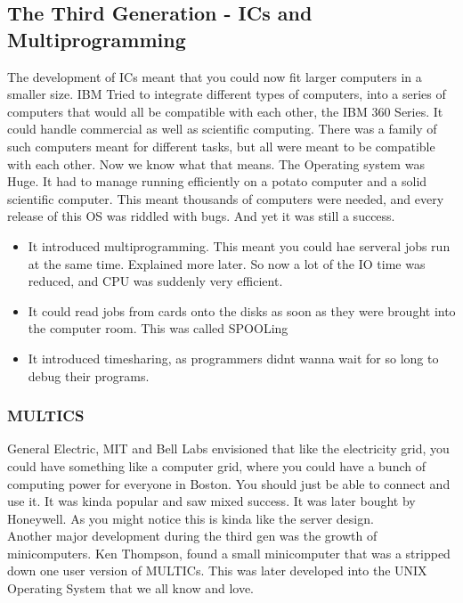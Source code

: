 \documentclass[11pt]{article}
\begin{document}
\subsection{The Third Generation - ICs and Multiprogramming}

The development of ICs meant that you could now fit larger computers in a smaller size. IBM Tried to integrate different types of computers, into a series of computers that would all be compatible with each other, the IBM 360 Series. It could handle commercial as well as scientific computing. There was a family of such computers meant for different tasks, but all were meant to be compatible with each other. Now we know what that means. The Operating system was Huge. It had to manage running efficiently on a potato computer and a solid scientific computer. This meant thousands of computers were needed, and every release of this OS was riddled with bugs. And yet it was still a success. 

\begin{itemize}
	\item It introduced multiprogramming. This meant you could hae serveral jobs run at the same time. Explained more later. So now a lot of the IO time was reduced, and CPU was suddenly very efficient. 
	\item It could read jobs from cards onto the disks as soon as they were brought into the computer room. This was called SPOOLing
	\item It introduced timesharing, as programmers didnt wanna wait for so long to debug their programs. 
\end{itemize}

\subsubsection{MULTICS}
General Electric, MIT and Bell Labs envisioned that like the electricity grid, you could have something like a computer grid, where you could have a bunch of computing power for everyone in Boston. You should just be able to connect and use it. It was kinda popular and saw mixed success. It was later bought by Honeywell. As you might notice this is kinda like the server design. \\
Another major development during the third gen was the growth of minicomputers. Ken Thompson, found a small minicomputer that was a stripped down one user version of MULTICs. This was later developed into the UNIX Operating System that we all know and love. 
\end{document}
